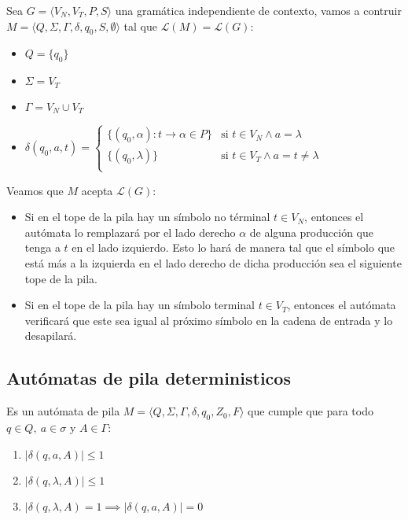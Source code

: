 \begin{demo}[0.8\textwidth]

  Sea \(G = \langle V_N, V_T, P, S \rangle\) una gramática independiente de contexto, vamos a contruir \(M=\langle Q, \Sigma, \Gamma, \delta, q_0, S, \emptyset \rangle\) tal que \(\mathcal{L}(M) = \mathcal{L}(G)\):
  \begin{itemize}
    \item \(Q = \{q_0\}\)
    \item \(\Sigma = V_T\)
    \item \(\Gamma = V_N\cup V_T\)
    \item \(\delta(q_0, a, t) = \begin{cases}
            \{(q_0,\alpha) : t \to \alpha \in P \} & \text{si } t \in V_N \land a = \lambda        \\
            \{(q_0, \lambda)\}                     & \text{si } t \in V_T \land a = t \neq \lambda \\
          \end{cases}\)
  \end{itemize}
\end{demo}
\begin{demoPart}[0.8\textwidth]
  Veamos que \(M\) acepta \(\mathcal{L}(G)\):
  \begin{itemize}
    \item Si en el tope de la pila hay un símbolo no términal \(t\in V_N\), entonces el autómata lo remplazará por el lado derecho \(\alpha\) de alguna producción que tenga a \(t\) en el lado izquierdo. Esto lo hará de manera tal que el símbolo que está más a la izquierda en el lado derecho de dicha producción sea el siguiente tope de la pila.
    \item Si en el tope de la pila hay un símbolo terminal \(t\in V_T\), entonces el autómata verificará que este sea igual al próximo símbolo en la cadena de entrada y lo desapilará.
  \end{itemize}
\end{demoPart}

\subsection{Autómatas de pila deterministicos}
Es un autómata de pila \(M=\langle Q, \Sigma, \Gamma, \delta, q_0, Z_0, F \rangle\) que cumple que para todo \(q\in Q,~a\in\sigma\) y \(A \in \Gamma\):
\begin{enumerate}
  \item \(|\delta(q,a,A)|\leq 1\)
  \item \(|\delta(q,\lambda,A)| \leq 1\)
  \item \(|\delta(q,\lambda, A) = 1 \implies |\delta(q, a, A)| = 0\)
\end{enumerate}

